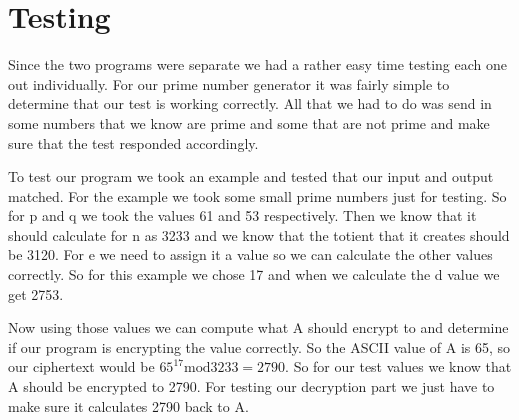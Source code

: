 \documentclass[12pt,technote]{IEEEtran}
\begin{document}
\section{Testing}
Since the two programs were separate we had a rather easy time testing each one 
out individually. 
For our prime number generator it was fairly simple to determine that our test 
is working correctly. All that we had to do was send in some numbers that we 
know are prime and some that are not prime and make sure that the test
responded accordingly.
\par To test our program we took an example and tested that our input and output 
matched. For the example we took some small prime numbers just for testing. So 
for p and q we took the values 61 and 53 respectively. Then we know that it 
should calculate for n as 3233 and we know that the totient that it creates 
should be 3120. For e we need to assign it a value so we can calculate the other 
values correctly. So for this example we chose 17 and when we calculate the d 
value we get 2753. 
\par Now using those values we can compute what A should encrypt to and 
determine if our program is encrypting the value correctly. So the ASCII value 
of A is 65, so our ciphertext would be ${65}^{17}\mathrm{mod}3233=2790$. So for 
our test values we know that A should be encrypted to 2790. For testing our 
decryption part we just have to make sure it calculates 2790 back to A.
\end{document}
